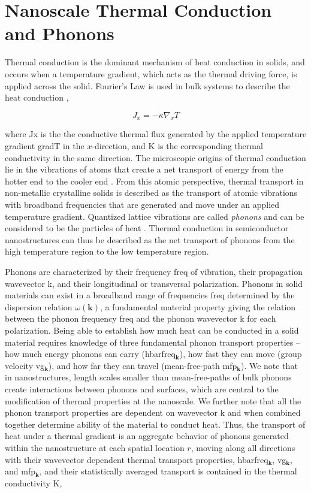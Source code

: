   \section{Nanoscale Thermal Conduction and Phonons}
Thermal conduction is the dominant mechanism of heat conduction in solids, and occurs when a temperature gradient, which acts as the thermal driving force, is applied across the solid. Fourier's Law is used in bulk systems to describe the heat conduction \cite{book_Bird},

\begin{equation}
J_x = -\kappa \nabla_x T
\label{eq:fourier}
\end{equation} 

where \gls{Jx} is the the conductive thermal flux generated by the applied temperature gradient \gls{gradT} in the $x$-direction, and \gls{K} is the corresponding thermal conductivity in the same direction.  The microscopic origins of thermal conduction lie in the vibrations of atoms that create a net transport of energy from the hotter end to the cooler end \cite{book_Reif}. From this atomic perspective, thermal transport in non-metallic crystalline solids is described as the transport of atomic vibrations with broadband frequencies that are generated and move under an applied temperature gradient. Quantized lattice vibrations are called \textit{phonons} and can be considered to be the particles of heat \cite{book_Ashcroft}. Thermal conduction in semiconductor nanostructures can thus be described as the net transport of phonons from the high temperature region to the low temperature region. 
\par Phonons are characterized by their frequency \gls{freq} of vibration, their propagation wavevector \gls{k}, and their longitudinal or transversal polarization. Phonons in solid materials can exist in a broadband range of frequencies \gls{freq} determined by the dispersion relation $\omega(\mathbf{k})$, a fundamental material property giving the relation between the phonon frequency  \gls{freq} and the phonon wavevector \gls{k} for each polarization. Being able to establish how much heat can be conducted in a solid material requires knowledge of three fundamental phonon transport properties -- how much energy phonons can carry (\gls{hbar}\gls{freq}$_\mathbf{k}$), how fast they can move (group velocity \gls{vg}$_\mathbf{k}$), and how far they can travel (mean-free-path \gls{mfp}$_\mathbf{k}$). We note that in nanostructures, length scales smaller than mean-free-paths of bulk phonons create interactions between phonons and surfaces, which are central to the modification of thermal properties at the nanoscale. We further note that all the phonon transport properties are dependent on wavevector \gls{k} and when combined together determine ability of the material to conduct heat. Thus, the transport of heat under a thermal gradient is an aggregate behavior of phonons generated within the nanostructure at each spatial location $r$, moving along all directions with their wavevector dependent thermal transport properties, \gls{hbar}\gls{freq}$_\mathbf{k}$, \gls{vg}$_\mathbf{k}$, and \gls{mfp}$_\mathbf{k}$, and their statistically averaged transport is contained in the thermal conductivity \gls{K},

